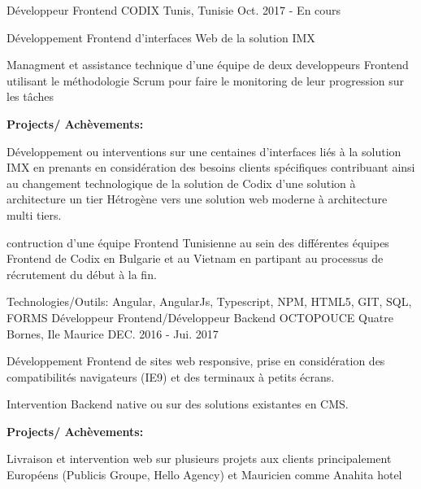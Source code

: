 \begin{cventries}
  \techentries
    {Développeur Frontend}
    {CODIX}
    {Tunis, Tunisie}
    {Oct. 2017 - En cours}
    {
      \begin{cvitems}
		\item {Développement Frontend d'interfaces Web de la solution IMX }		
		\item {Managment et assistance technique d'une équipe de deux developpeurs Frontend utilisant le méthodologie Scrum pour faire le monitoring de leur progression sur les tâches}		
      \end{cvitems}	
\vspace{10pt}\textbf{Projects/ Achèvements:}
      \begin{cvitems}
	{\vspace{14pt}}
        \item {Développement ou interventions sur une centaines d'interfaces liés à la solution IMX en prenants en considération des besoins clients spécifiques contribuant ainsi au changement technologique de la solution de Codix d'une solution à architecture un tier Hétrogène vers une solution web moderne à architecture multi tiers. }
        \item {contruction d'une équipe Frontend Tunisienne au sein des différentes équipes Frontend de Codix en Bulgarie et au Vietnam en partipant au processus de récrutement du début à la fin. }
      \end{cvitems}
    }
    {\textcolor{awesome}{Technologies/Outils: } {\color{graytext}}  {Angular, AngularJs, Typescript, NPM, HTML5, GIT, SQL, FORMS}}
	{} 
    { 
    }
  \techentries
    {Développeur Frontend/Développeur Backend}
    {OCTOPOUCE}
    {Quatre Bornes, Ile Maurice}
    {DEC. 2016 - Jui. 2017}
    {
      \begin{cvitems}
		\item {Développement Frontend de sites web responsive, prise en considération des compatibilités navigateurs (IE9) et des terminaux à petits écrans.}		
		\item {Intervention Backend native ou sur des solutions existantes en CMS.}
      \end{cvitems}\vspace{10pt}\textbf{Projects/ Achèvements:}
      \begin{cvitems}
	{\vspace{14pt}}
        \item {Livraison et intervention web sur plusieurs projets aux clients principalement Européens (Publicis Groupe, Hello Agency) et Mauricien comme Anahita hotel }

\end{cvitems}}
\end{cventries}
